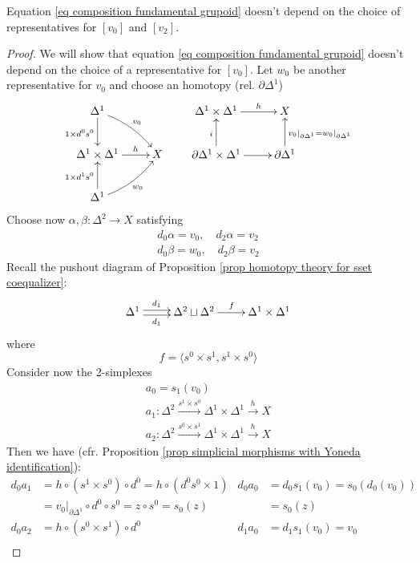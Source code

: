 \begin{lemma}
Equation \eqref{eq composition fundamental grupoid} doesn't depend on the choice of representatives for $[v_0]$ and $[v_2]$.
\end{lemma}

\begin{proof}
We will show that equation \ref{eq composition fundamental grupoid} doesn't depend on the choice of a representative for $[v_0]$. Let $w_0$ be another representative for $v_0$ and choose an homotopy ($\text{rel. } \partial \Delta^1$)
\[
\xymatrix{
\Delta^1 \ar[d]_{1 \times d^0 s^0} \ar@/^.5pc/[dr]^{v_0} \\ \Delta^1 \times \Delta^1 \ar[r]^-h & X \\ \Delta^1 \ar[u]^{1 \times d^1 s^0} \ar@/_.5pc/[ur]_{w_0}
} \qquad
\xymatrix{
\Delta^1 \times \Delta^1 \ar[r]^-h & X \\ \partial \Delta^1 \times \Delta^1 \ar[u]^i \ar[r] & \partial \Delta^1 \ar[u]_{v_0 |_{\partial \Delta^1} = w_0 |_{\partial \Delta^1}}
}
\]
Choose now $\alpha,\beta \colon \Delta^2 \to X$ satisfying
\begin{gather*}
d_0 \alpha = v_0, \quad d_2 \alpha = v_2 \\
d_0 \beta = w_0, \quad d_2 \beta = v_2
\end{gather*}
Recall the pushout diagram of Proposition \ref{prop homotopy theory for sset coequalizer}:
\[
\xymatrix{
\Delta^1 \ar@<.5ex>[r]^-{d_1} \ar@<-.5ex>[r]_-{d_1} & \Delta^2 \sqcup \Delta^2 \ar[r]^f & \Delta^1 \times \Delta^1
}
\]
where
\[
f = \langle s^0 \times s^1, s^1 \times s^0 \rangle
\]
Consider now the 2-simplexes
\begin{gather*}
a_0 = s_1(v_0) \\
a_1 \colon \Delta^2 \xrightarrow{s^1 \times s^0} \Delta^1 \times \Delta^1 \xrightarrow{h} X \\
a_2 \colon \Delta^2 \xrightarrow{s^0 \times s^1} \Delta^1 \times \Delta^1 \xrightarrow{h} X
\end{gather*}
Then we have (cfr. Proposition \ref{prop simplicial morphisms with Yoneda identification}):
\begin{align*}
d_0 a_1 & = h \circ (s^1 \times s^0) \circ d^0 = h \circ (d^0 s^0 \times 1) & d_0 a_0 & = d_0 s_1 (v_0) = s_0(d_0(v_0)) \\
& = v_0 |_{\partial \Delta^1} \circ d^0 \circ s^0 = z \circ s^0 = s_0(z) & & = s_0(z) \\
d_0 a_2 & = h \circ (s^0 \times s^1) \circ d^0 & d_1 a_0 & = d_1 s_1(v_0) = v_0 \\

\end{align*}
\end{proof}
